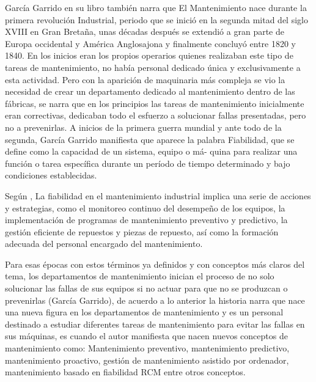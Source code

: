 \documentclass[
  11pt,
  bookmarksnumbered]{article}
\begin{document}
García Garrido en su libro también narra que El Mantenimiento nace durante la primera revolución Industrial, periodo que se inició en la segunda mitad del siglo XVIII en Gran Bretaña, unas décadas después se extendió a gran parte de Europa occidental y América Anglosajona y finalmente concluyó entre 1820 y 1840.
En los inicios eran los propios operarios quienes realizaban este tipo de tareas de mantenimiento, no había personal dedicado única y exclusivamente a esta actividad.
Pero con la aparición de maquinaria más compleja se vio la necesidad de crear un departamento dedicado al mantenimiento dentro de las fábricas, se narra que en los principios las tareas de mantenimiento inicialmente eran correctivas, dedicaban todo el esfuerzo a solucionar fallas presentadas, pero no a prevenirlas.
A inicios de la primera guerra mundial y ante todo de la segunda, García Garrido manifiesta que aparece la palabra Fiabilidad, que se define como la capacidad de un sistema, equipo o má- quina para realizar una función o tarea específica durante un período de tiempo determinado y bajo condiciones establecidas.

Según \textcite{Smith2018}, La fiabilidad en el mantenimiento industrial implica una serie de acciones y estrategias, como el monitoreo continuo del desempeño de los equipos, la implementación de programas de mantenimiento preventivo y predictivo, la gestión eficiente de repuestos y piezas de repuesto, así como la formación adecuada del personal encargado del mantenimiento.

Para esas épocas con estos términos ya definidos y con conceptos más claros del tema, los departamentos de mantenimiento inician el proceso de no solo solucionar las fallas de sus equipos si no actuar para que no se produzcan o prevenirlas (García Garrido), de acuerdo a lo anterior la historia narra que nace una nueva figura en los departamentos de mantenimiento y es un personal destinado a estudiar diferentes tareas de mantenimiento para evitar las fallas en sus máquinas, es cuando el autor manifiesta que nacen nuevos conceptos de mantenimiento como: Mantenimiento preventivo, mantenimiento predictivo, mantenimiento proactivo, gestión de mantenimiento asistido por ordenador, mantenimiento basado en fiabilidad RCM entre otros conceptos.
\end{document}
